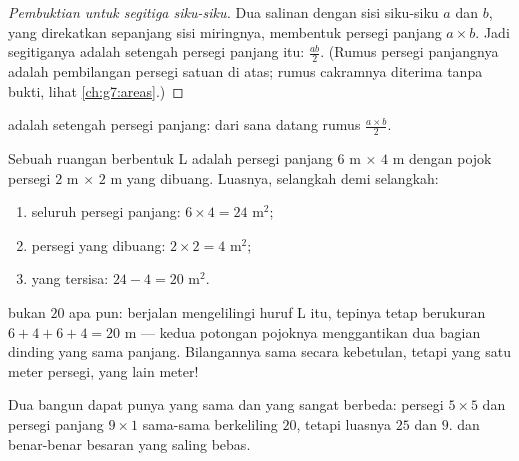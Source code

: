 \begin{proof}[Pembuktian untuk segitiga siku-siku]
Dua salinan  dengan sisi siku-siku $a$ dan $b$, yang
direkatkan sepanjang sisi miringnya, membentuk persegi panjang
$a \times b$. Jadi  segitiganya adalah setengah  persegi
panjang itu: $\frac{ab}{2}$. (Rumus persegi panjangnya adalah
pembilangan persegi satuan di atas; rumus cakramnya diterima tanpa
bukti, lihat \cref{ch:g7:areas}.)
\end{proof}

\begin{omfigure}

{\small {} adalah setengah persegi panjang: dari sana
datang rumus $\frac{a\times b}{2}$.}
\end{omfigure}

\begin{example}\label{ex:g6:measure:composite}
Sebuah ruangan berbentuk L adalah persegi panjang $6$ m $\times$ $4$ m
dengan pojok persegi $2$ m $\times$ $2$ m yang dibuang. Luasnya,
selangkah demi selangkah:
\begin{enumerate}
  \item seluruh persegi panjang: $6 \times 4 = 24$ m$^2$;
  \item persegi yang dibuang: $2 \times 2 = 4$ m$^2$;
  \item {} yang tersisa: $24 - 4 = 20$ m$^2$.
\end{enumerate}
\emph{} bukan $20$ apa pun: berjalan mengelilingi huruf L
itu, tepinya tetap berukuran $6 + 4 + 6 + 4 = 20$ m --- kedua potongan
pojoknya menggantikan dua bagian dinding yang sama panjang. Bilangannya
sama secara kebetulan, tetapi yang satu meter persegi, yang lain meter!
\end{example}

\begin{remark}
Dua bangun dapat punya  yang sama dan  yang sangat
berbeda: persegi $5 \times 5$ dan persegi panjang $9 \times 1$
sama-sama berkeliling $20$, tetapi luasnya $25$ dan $9$.  dan
 benar-benar besaran yang saling bebas.
\end{remark}

